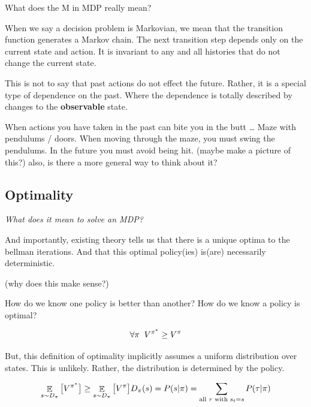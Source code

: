 \begin{displayquote}
  What does the M in MDP really mean?
\end{displayquote}

When we say a decision problem is Markovian, we mean that the transition
function generates a Markov chain. The next transition step depends only
on the current state and action. It is invariant to any and all histories that do not
change the current state.

This is not to say that past actions do not effect the future. Rather,
it is a special type of dependence on the past. Where the dependence is
totally described by changes to the \textbf{observable} state.


When actions you have taken in the past can bite you in the butt \ldots{}
Maze with pendulums / doors. When moving through the maze, you must
swing the pendulums. In the future you must avoid being hit. (maybe make
a picture of this?) also, is there a more general way to think about it?

\hypertarget{optimality}{%
\subsection{Optimality}\label{optimality}}

\begin{displayquote}
  \textit{What does it mean to solve an MDP?}
\end{displayquote}

And importantly, existing theory tells us that there is a unique optima to the bellman iterations.
And that this optimal policy(ies) is(are) necessarily deterministic.

(why does this make sense?)


How do we know one policy is better than another? How do we know a
policy is optimal?

\[
\forall \pi\;\; V^{\pi^* } \ge V^{\pi} \\
\]

But, this definition of optimality implicitly assumes a uniform
distribution over states. This is unlikely. Rather, the distribution is
determined by the policy.

\[
\mathop{{\mathbb E}}_{s\sim D_{\pi}} \big[ V^{\pi^* } \big] \ge \mathop{{\mathbb E}}_{s\sim D_{\pi}} \big[ V^{\pi} \big] \\
D_{\pi}(s) = P(s | \pi) = \sum_{\text{all } \tau \text{ with } s_t = s} P(\tau | \pi)
\]

